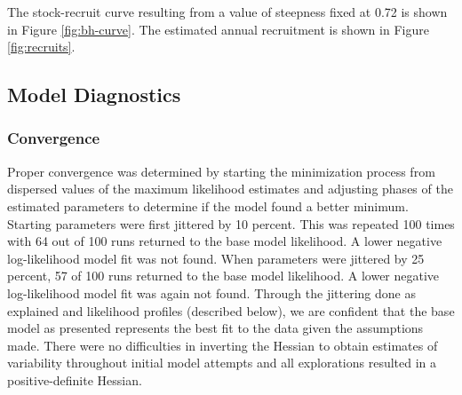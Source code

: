 \documentclass[11pt,
  english,
  a4paper,
]{article}
\begin{document}
\leavevmode\tagmcend\tagstructend\par


The stock-recruit curve resulting from a value of steepness fixed at 0.72 is shown in Figure \ref{fig:bh-curve}. The estimated annual recruitment is shown in Figure \ref{fig:recruits}.

\leavevmode\tagmcend\tagstructend\par


\hypertarget{model-diagnostics}{%
\subsection{Model Diagnostics}\label{model-diagnostics}}

\leavevmode\tagmcend\tagstructend


\hypertarget{convergence}{%
\subsubsection{Convergence}\label{convergence}}

\leavevmode\tagmcend\tagstructend


Proper convergence was determined by starting the minimization process from dispersed values of the maximum likelihood estimates and adjusting phases of the estimated parameters to determine if the model found a better minimum. Starting parameters were first jittered by 10 percent. This was repeated 100 times with 64 out of 100 runs returned to the base model likelihood. A lower negative log-likelihood model fit was not found. When parameters were jittered by 25 percent, 57 of 100 runs returned to the base model likelihood. A lower negative log-likelihood model fit was again not found. Through the jittering done as explained and likelihood profiles (described below), we are confident that the base model as presented represents the best fit to the data given the assumptions made. There were no difficulties in inverting the Hessian to obtain estimates of variability throughout initial model attempts and all explorations resulted in a positive-definite Hessian.

\leavevmode\tagmcend\tagstructend\par
\end{document}
